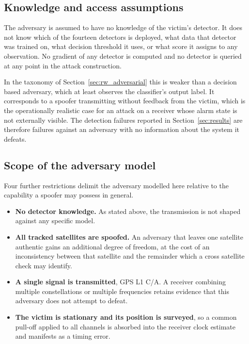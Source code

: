 \documentclass[pdflatex,sn-basic]{sn-jnl}
\theoremstyle{thmstyleone}
\theoremstyle{thmstyletwo}
\theoremstyle{thmstylethree}
\begin{document}
\subsection{Knowledge and access assumptions}

The adversary is assumed to have no knowledge of the victim's detector. It does not know
which of the fourteen detectors is deployed, what data that detector was trained on, what
decision threshold it uses, or what score it assigns to any observation. No gradient of any
detector is computed and no detector is queried at any point in the attack construction.

In the taxonomy of Section~\ref{sec:rw_adversarial} this is weaker than a decision based
adversary, which at least observes the classifier's output label. It corresponds to a
spoofer transmitting without feedback from the victim, which is the operationally
realistic case for an attack on a receiver whose alarm state is not externally visible. The
detection failures reported in Section~\ref{sec:results} are therefore failures against an
adversary with no information about the system it defeats.

\subsection{Scope of the adversary model}

Four further restrictions delimit the adversary modelled here relative to the capability a
spoofer may possess in general.

\begin{itemize}
  \item \textbf{No detector knowledge.} As stated above, the transmission is not shaped
  against any specific model.
  \item \textbf{All tracked satellites are spoofed.} An adversary that leaves one
  satellite authentic gains an additional degree of freedom, at the cost of an
  inconsistency between that satellite and the remainder which a cross satellite check may
  identify.
  \item \textbf{A single signal is transmitted}, GPS L1 C/A. A receiver combining multiple
  constellations or multiple frequencies retains evidence that this adversary does not
  attempt to defeat.
  \item \textbf{The victim is stationary and its position is surveyed}, so a common
  pull-off applied to all channels is absorbed into the receiver clock estimate and
  manifests as a timing error.
\end{itemize}
\end{document}
